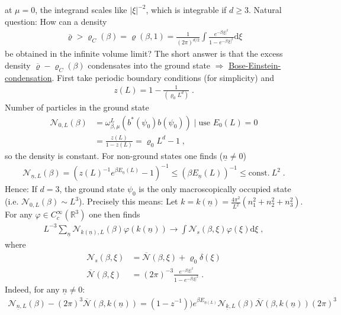 \documentclass[
a4paper, %
11pt, %
onecolumn, %
openany, %
]{memoir}
\theoremstyle{definition}
\theoremstyle{remark}
\theoremstyle{plain}
\begin{document}
at $\mu=0$, the integrand scales like $|\xi|^{-2}$, which is integrable if $d\geq 3$. Natural question: How can a density 
\begin{align}
\overline{\varrho}>\varrho_C(\beta)=\varrho(\beta,1)=\frac{1}{(2\pi)^{d/2}}\int \frac{e^{- \beta |\xi|^2}}{1-e^{-\beta |\xi|^2}}\mathrm{d}\xi
\end{align} be obtained in the infinite volume limit? The short answer is that the excess density $\overline{\varrho}-\varrho_C(\beta)$ condensates into the ground state $\Rightarrow$ \underline{Bose-Einstein-condensation}.
First take periodic boundary conditions (for simplicity) and \begin{align}
z(L)=1-\frac{1}{(\varrho_0L^d)}\; .
\end{align}
Number of particles in the ground state \begin{align}
\mathcal{N}_{0,L}(\beta)&=\omega_{\beta,\mu}^L(b^*(\psi_0)b(\psi_0))\mid \text{use }E_0(L)=0\\&=\frac{z(L)}{1-z(L)}=\varrho_0 L^d-1\; ,\label{eqn::relation_nz}
\end{align}
so the density is constant. For non-ground states one finds ($\underline{n}\neq 0$) \begin{align}
\mathcal{N}_{\underline{n},L}(\beta)=(z(L)^{-1}e^{\beta E_{\underline{n}}(L)}-1)^{-1}\leq (\beta E_{\underline{n}}(L))^{-1}\leq \mathrm{const. }~L^2\; .
\end{align}
Hence: If $d=3$, the ground state $\psi_0$ is the only macroscopically occupied state (i.e. $\mathcal{N}_{0,L}(\beta)\sim L^3$). Precisely this means: Let $k=k(\underline{n})=\frac{4\pi^2}{L^2}(n_1^2+n_2^2+n_3^2)$. For any $\varphi\in C_c^{\infty}(\mathbb{R}^3)$ one then finds \begin{align}
L^{-3}\sum_{\underline{n}}\mathcal{N}_{k(\underline{n}),L}(\beta)\varphi(k(\underline{n}))\rightarrow \int \mathcal{N}_s(\beta,\xi)\varphi(\xi)\mathrm{d}\xi\; ,
\end{align}
where  \begin{align}\mathcal{N}_s(\beta,\xi)&=\overline{\mathcal{N}}(\beta,\xi)+\varrho_0 \delta(\xi) \\
\overline{\mathcal{N}}(\beta,\xi)&=(2\pi)^{-3}\frac{e^{-\beta|\xi|^2}}{1-e^{-\beta|\xi|^2}}\; .
\end{align}
Indeed, for any $\underline{n}\neq 0$: \begin{align}
\mathcal{N}_{\underline{n},L}(\beta)-(2\pi)^3\overline{\mathcal{N}}(\beta, k(\underline{n}))=(1-z^{-1}))e^{\beta E_{\underline{n}(L)}}\mathcal{N}_{\underline{k},L}(\beta)\overline{\mathcal{N}}(\beta,k(\underline{n}))(2\pi)^3
\end{align}
\end{document}
